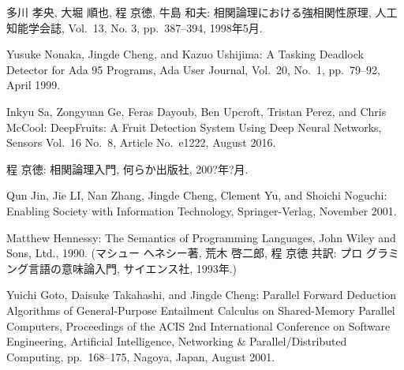 \documentclass[a4paper, 12pt]{ltjreport}
\begin{document}
\begin{thebibliography}{99}
\label{sannkoubunnkenn_chapter}

%


多川 孝央, 大堀 順也, 程 京徳, 牛島 和夫: 相関論理における強相関性原理,
        人工知能学会誌, Vol.\ 13, No. 3, pp.\ 387--394, 1998年5月.

Yusuke Nonaka, Jingde Cheng, and Kazuo Ushijima: A Tasking Deadlock
        Detector for Ada 95 Programs, Ada User Journal, Vol.\ 20, No.\ 1,
        pp.\ 79--92, April 1999.

        Inkyu Sa, Zongyuan Ge, Feras Dayoub, Ben Upcroft, Tristan Perez, and Chris McCool: DeepFruits: A Fruit Detection System Using Deep Neural Networks, Sensors Vol.\ 16 No.\ 8, Article No.\ e1222, August 2016.


程 京徳: 相関論理入門, 何らか出版社, 200?年?月.

Qun Jin, Jie LI, Nan Zhang, Jingde Cheng, Clement Yu, and Shoichi
        Noguchi: Enabling Society with Information Technology,
        Springer-Verlag, November 2001.

Matthew Hennessy: The Semantics of Programming Languages, John Wiley and
Sons, Ltd., 1990. (マシュー ヘネシー著, 荒木 啓二郎, 程 京徳 共訳: プロ
グラミング言語の意味論入門, サイエンス社, 1993年.)

Yuichi Goto, Daisuke Takahashi, and Jingde Cheng: Parallel Forward
        Deduction Algorithms of General-Purpose Entailment Calculus on
        Shared-Memory Parallel Computers, Proceedings of the ACIS 2nd
        International Conference on Software Engineering, Artificial
        Intelligence, Networking \& Parallel/Distributed Computing,
        pp.\ 168--175, Nagoya, Japan, August 2001.


\end{thebibliography}
\end{document}

